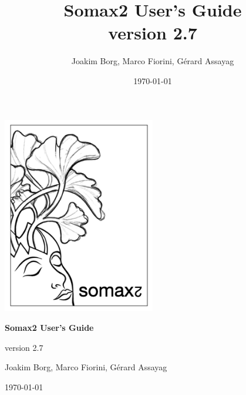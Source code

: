 \documentclass[11pt, a4paper]{report}
\title{Somax2 User's Guide\\[0.24cm]
	\large{version 2.7}}
\author{Joakim Borg, Marco Fiorini, Gérard Assayag}
\date{\today}
\begin{document}
\begin{titlepage}
	\centering

\includegraphics[width=0.5\textwidth]{img/somax_logo.png}\par\vspace{1cm}

{\huge\bfseries Somax2 User's Guide\par}
\vspace{20pt}
\centering
{\large version 2.7\par}
\vspace{20pt} 
{\large{Joakim Borg, Marco Fiorini, Gérard Assayag}}



\vfill

{\large \today\par}
\end{titlepage}


\tableofcontents







\end{document}
